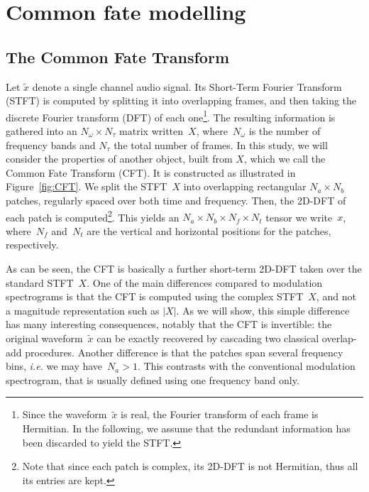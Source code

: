 \section{Common fate modelling}

\label{sec:model}

\subsection{The Common Fate Transform}

\label{sub:CFT}

Let $\tilde{x}$ denote a single channel audio signal.
Its Short-Term Fourier Transform (STFT) is computed by splitting it
into overlapping frames, and then taking the discrete Fourier transform (DFT)
of each one\footnote{Since the waveform~$\tilde{x}$ is real, the Fourier transform of
each frame is Hermitian. In the following, we assume that the redundant
information has been discarded to yield the STFT.}. The resulting information is gathered into an $N_{\omega}\times N_{\tau}$
matrix written~$X$, where~$N_{\omega}$ is the number of frequency
bands and $N_{\tau}$ the total number of frames.
%
In this study, we will consider the properties of another object,
built from $X$, which we call the Common Fate Transform (CFT). It
is constructed as illustrated in Figure~\ref{fig:CFT}.
We split the STFT~$X$ into overlapping rectangular $N_{a}\times N_{b}$
patches, regularly spaced over both time and frequency. Then, the
2D-DFT of each patch is computed\footnote{Note that since each patch is complex, its 2D-DFT is not Hermitian,
thus all its entries are kept.}. This yields an $N_{a}\times N_{b}\times N_{f}\times N_{t}$ tensor we write~$x$,
where~$N_{f}$ and~$N_{t}$ are the vertical and horizontal
positions for the patches, respectively.

As can be seen, the CFT is basically a further short-term 2D-DFT taken over
the standard STFT~$X$. One of the main differences compared to modulation spectrograms
is that the CFT is computed using the complex STFT~$X$, and not a magnitude representation such as $\left|X\right|$. As we will
show, this simple difference has many interesting consequences, notably
that the CFT is invertible: the original waveform~$\tilde{x}$ can
be exactly recovered by cascading two classical overlap-add procedures. Another difference
is that the patches span several frequency bins, \emph{i.e.} we may have~$N_{a}>1$.
This contrasts with the conventional modulation spectrogram, that
is usually defined using one frequency band only.

